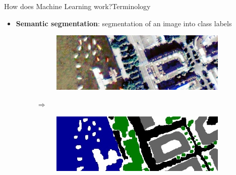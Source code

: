 \documentclass{beamer}
\begin{document}
\begin{frame}{How does Machine Learning work?}{Terminology}
\begin{itemize}
\begin{figure}[H]
\begin{subfigure}{.1\textwidth}
		\end{subfigure} $\Rightarrow$ ``7''
	\end{figure}\pause
	\item \textbf{Semantic segmentation}: segmentation of an image into class labels
	\begin{figure}[H]
		\begin{subfigure}{0.38\textwidth}
			\centering
			\includegraphics[width=\textwidth]{Im_11_detail.jpg}
		\end{subfigure} $\Rightarrow$
		\begin{subfigure}{0.38\textwidth}
			\centering
			\includegraphics[width=\textwidth]{GT_11_detail.jpg}
		\end{subfigure}
	\end{figure}
\end{itemize}
\end{frame}
\end{document}
